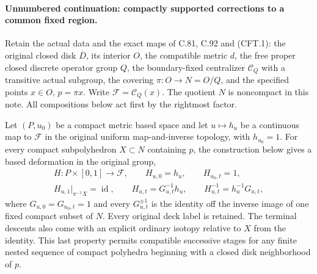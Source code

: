 \documentclass[11pt,a4paper]{article}
\DeclareMathOperator{\id}{id}\DeclareMathOperator{\im}{im}
\begin{document}
\paragraph{Unnumbered continuation: compactly supported corrections to a common fixed region.}
Retain the actual data and the exact maps of C.81, C.92 and (CFT.1):
the original closed disk $\overline D$, its interior $O$, the compatible
metric $d$, the free proper closed discrete operator group $Q$, the
boundary-fixed centralizer $\mathscr C_Q$ with a transitive actual
subgroup, the covering $\pi:O\to N=O/Q$, and the specified points
$x\in O$, $p=\pi x$. Write $\mathscr F=\mathscr C_Q(x)$.
The quotient $N$ is noncompact in this note. All compositions below
act first by the rightmost factor.

Let $(P,u_0)$ be a compact metric based space and let
$u\mapsto h_u$ be a continuous map to $\mathscr F$ in the original
uniform map-and-inverse topology, with $h_{u_0}=1$.
For every compact subpolyhedron $X\subset N$ containing $p$, the
construction below gives a based deformation in the original group,
\[
\begin{gathered}
 H:P\times[0,1]\longrightarrow\mathscr F,\qquad
 H_{u,0}=h_u,\qquad H_{u_0,t}=1,\\
 H_{u,1}|_{\pi^{-1}X}=\id,\qquad
 H_{u,t}=G_{u,t}^{-1}h_u,\qquad
 H_{u,t}^{-1}=h_u^{-1}G_{u,t},
\end{gathered}                                                    \tag{IFR.1}
\]
where $G_{u,0}=G_{u_0,t}=1$ and every $G_{u,t}^{\pm1}$ is the
identity off the inverse image of one fixed compact subset of $N$.
Every original deck label is retained. The terminal descents also
come with an explicit ordinary isotopy relative to $X$ from the
identity. This last property permits compatible successive stages
for any finite nested sequence of compact polyhedra beginning with
a closed disk neighborhood of $p$.
\end{document}
